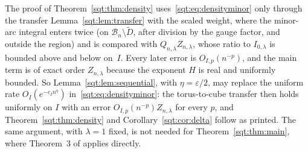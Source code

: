 The proof of Theorem~\ref{sqt:thm:density} uses~\eqref{sqt:eq:densityminor}
only through the transfer Lemma~\ref{sqt:lem:transfer} with the scaled
weight, where the minor-arc integral enters twice (on
$\mathcal B_n\setminus\widetilde D$, after division by the gauge factor, and
outside the region) and is compared with $Q_{n,\lambda}Z_{n,\lambda}$, whose
ratio to $I_{0,\lambda}$ is bounded above and below on~$I$. Every later error
is $O_{I,p}(n^{-p})$, and the main term is of exact order $Z_{n,\lambda}$
because the exponent $H$ is real and uniformly bounded. So
Lemma~\ref{sqt:lem:sequential}, with $\eta=\varepsilon/2$, may replace the
uniform rate $O_I(e^{-c_In^\eta})$ in~\eqref{sqt:eq:densityminor}: the
torus-to-cube transfer then holds uniformly on $I$ with an error
$O_{I,p}(n^{-p})Z_{n,\lambda}$ for every $p$, and
Theorem~\ref{sqt:thm:density} and Corollary~\ref{sqt:cor:delta} follow as
printed. The same argument, with $\lambda=1$ fixed, is not needed for
Theorem~\ref{sqt:thm:main}, where Theorem~3 of \cite{CM} applies directly.

